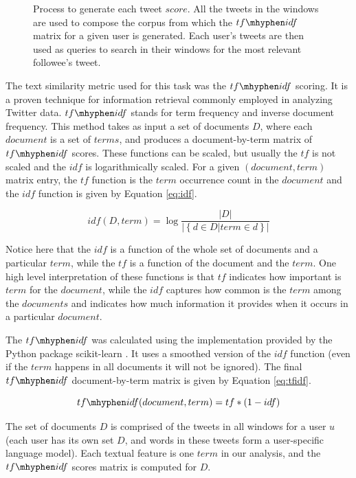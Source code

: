 \begin{figure}[!tb]
\centering
\fontsize{8pt}{10pt}\selectfont

\caption{Process to generate each tweet $score$. All the tweets in the windows are used to compose the corpus from which the $tf\mhyphen idf$ matrix for a given user is generated. Each user's tweets are then used as queries to search in their windows for the most relevant followee's tweet.} 
\label{fig:fig_tfidf_explanation}
\end{figure}

The text similarity metric used for this task was the $tf\mhyphen idf$ scoring. It is a proven technique for information retrieval commonly employed in analyzing Twitter data. 
$tf\mhyphen idf$ stands for term frequency and inverse document frequency. This method takes as input a set of documents $D$, where each $document$ is a set of $terms$, and produces a document-by-term matrix of $tf\mhyphen idf$ scores. These functions can be scaled, but usually the $tf$ is not scaled and the $idf$ is logarithmically scaled. For a given $(document,term)$ matrix entry, the $tf$ function is the $term$ occurrence count in the $document$ and the $idf$ function is given by Equation \ref{eq:idf}.

\begin{equation}
idf(D,term) = \log \frac{|D|}{|\left\{d \in D | term \in d\right\}|}
\label{eq:idf}
\end{equation}

Notice here that the $idf$ is a function of the whole set of documents and a particular $term$, while the $tf$ is a function of the document and the $term$.
One high level interpretation of these functions is that $tf$ indicates how important is $term$ for the $document$, while the $idf$ captures how common is the $term$ among the $documents$ and indicates how much information it provides when it occurs in a particular $document$.

The $tf\mhyphen idf$ was calculated using the implementation provided by the Python package scikit-learn \cite{scikit-learn}. It uses a smoothed version of the $idf$ function (even if the $term$ happens in all documents it will not be ignored). The final $tf\mhyphen idf$ document-by-term matrix is given by Equation \ref{eq:tfidf}.

\begin{equation}
tf\mhyphen idf(document,term) = tf*(1-idf)
\label{eq:tfidf}
\end{equation}

The set of documents $D$ is comprised of the tweets in all windows for a user $u$ (each user has its own set $D$, and words in these tweets form a user-specific language model). Each textual feature is one $term$ in our analysis, and the $tf\mhyphen idf$ scores matrix is computed for $D$. 

